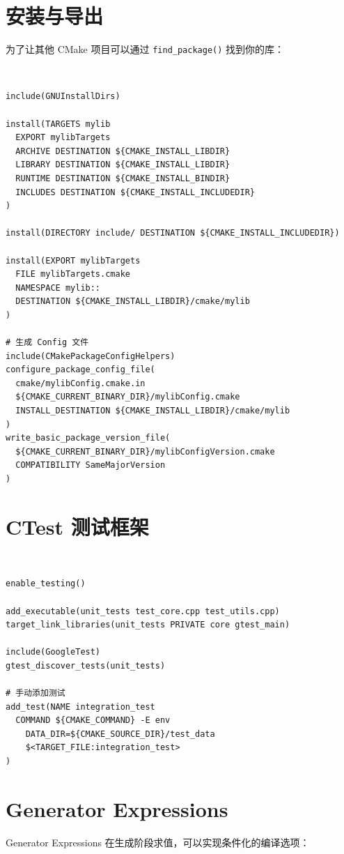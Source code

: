 \documentclass[12pt,a4paper,fontset=fandol]{ctexbook}
\newcommand{\Fn}[1]{\texttt{#1()}}
\newcommand{\cmakelabel}{%
  \noindent\begin{tcolorbox}[sharp corners,colback=cmakeheadbg,colframe=cmakeheadbg,
    left=6pt,right=6pt,top=2pt,bottom=2pt,boxrule=0pt]
  \textcolor{white}{\small\bfseries\sffamily CMake}\end{tcolorbox}%
}
\begin{document}
\section{安装与导出}

为了让其他 CMake 项目可以通过 \Fn{find\_package} 找到你的库：

\cmakelabel
\begin{lstlisting}[style=cmakestyle]
include(GNUInstallDirs)

install(TARGETS mylib
  EXPORT mylibTargets
  ARCHIVE DESTINATION ${CMAKE_INSTALL_LIBDIR}
  LIBRARY DESTINATION ${CMAKE_INSTALL_LIBDIR}
  RUNTIME DESTINATION ${CMAKE_INSTALL_BINDIR}
  INCLUDES DESTINATION ${CMAKE_INSTALL_INCLUDEDIR}
)

install(DIRECTORY include/ DESTINATION ${CMAKE_INSTALL_INCLUDEDIR})

install(EXPORT mylibTargets
  FILE mylibTargets.cmake
  NAMESPACE mylib::
  DESTINATION ${CMAKE_INSTALL_LIBDIR}/cmake/mylib
)

# 生成 Config 文件
include(CMakePackageConfigHelpers)
configure_package_config_file(
  cmake/mylibConfig.cmake.in
  ${CMAKE_CURRENT_BINARY_DIR}/mylibConfig.cmake
  INSTALL_DESTINATION ${CMAKE_INSTALL_LIBDIR}/cmake/mylib
)
write_basic_package_version_file(
  ${CMAKE_CURRENT_BINARY_DIR}/mylibConfigVersion.cmake
  COMPATIBILITY SameMajorVersion
)
\end{lstlisting}

\section{CTest 测试框架}

\cmakelabel
\begin{lstlisting}[style=cmakestyle]
enable_testing()

add_executable(unit_tests test_core.cpp test_utils.cpp)
target_link_libraries(unit_tests PRIVATE core gtest_main)

include(GoogleTest)
gtest_discover_tests(unit_tests)

# 手动添加测试
add_test(NAME integration_test
  COMMAND ${CMAKE_COMMAND} -E env
    DATA_DIR=${CMAKE_SOURCE_DIR}/test_data
    $<TARGET_FILE:integration_test>
)
\end{lstlisting}

\section{Generator Expressions}

Generator Expressions 在生成阶段求值，可以实现条件化的编译选项：
\end{document}
